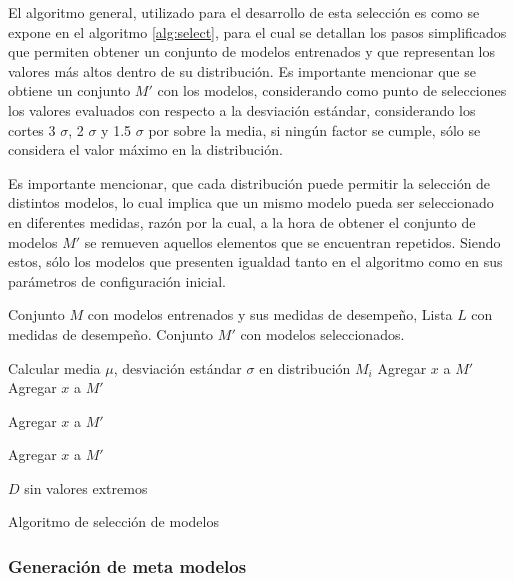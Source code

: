 El algoritmo general, utilizado para el desarrollo de esta selección es como se expone en el algoritmo \ref{alg:select}, para el cual se detallan los pasos simplificados que permiten obtener un conjunto de modelos entrenados y que representan los valores más altos dentro de su distribución. Es importante mencionar que se obtiene un conjunto $M'$ con los modelos, considerando como punto de selecciones los valores evaluados con respecto a la desviación estándar, considerando los cortes 3 $\sigma$, 2 $\sigma$ y 1.5 $\sigma$ por sobre la media, si ningún factor se cumple, sólo se considera el valor máximo en la distribución.

Es importante mencionar, que cada distribución puede permitir la selección de distintos modelos, lo cual implica que un mismo modelo pueda ser seleccionado en diferentes medidas, razón por la cual, a la hora de obtener el conjunto de modelos $M'$ se remueven aquellos elementos que se encuentran repetidos. Siendo estos, sólo los modelos que presenten igualdad tanto en el algoritmo como en sus parámetros de configuración inicial.

\begin{algorithm}[H]
	\begin{algorithmic}[1]
		\REQUIRE Conjunto $M$ con modelos entrenados y sus medidas de desempeño, Lista $L$ con medidas de desempeño. \label{lin:lineaRara}
		\ENSURE Conjunto $M'$ con modelos seleccionados.
		
		
		\STATE Calcular  media $\mu$, desviación estándar $\sigma$ en distribución $M_{i}$
				\STATE Agregar $x$ a $M'$
			\ENDIF
		\ENDFOR
					\STATE Agregar $x$ a $M'$
				\ENDIF
			\ENDFOR
			
						\STATE Agregar $x$ a $M'$
					\ENDIF
				\ENDFOR
				
							\STATE Agregar $x$ a $M'$
						\ENDIF
					\ENDFOR
				\ENDIF
			\ENDIF
		\ENDIF
		\ENDFOR
		
		\RETURN $D$ sin valores extremos
	\end{algorithmic}
	\caption{Algoritmo de selección de modelos}\label{alg:select}
\end{algorithm}

\subsubsection{Generación de meta modelos}

